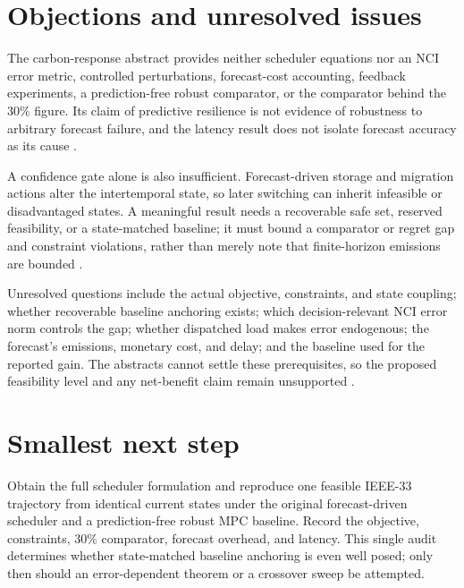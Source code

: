 \documentclass{article}
\begin{document}
\section{Objections and unresolved issues}

The carbon-response abstract provides neither scheduler equations nor an NCI error metric, controlled perturbations, forecast-cost accounting, feedback experiments, a prediction-free robust comparator, or the comparator behind the \(30\%\) figure.  Its claim of predictive resilience is not evidence of robustness to arbitrary forecast failure, and the latency result does not isolate forecast accuracy as its cause .

A confidence gate alone is also insufficient.  Forecast-driven storage and migration actions alter the intertemporal state, so later switching can inherit infeasible or disadvantaged states.  A meaningful result needs a recoverable safe set, reserved feasibility, or a state-matched baseline; it must bound a comparator or regret gap and constraint violations, rather than merely note that finite-horizon emissions are bounded .

Unresolved questions include the actual objective, constraints, and state coupling; whether recoverable baseline anchoring exists; which decision-relevant NCI error norm controls the gap; whether dispatched load makes error endogenous; the forecast's emissions, monetary cost, and delay; and the baseline used for the reported gain.  The abstracts cannot settle these prerequisites, so the proposed feasibility level and any net-benefit claim remain unsupported .

\section{Smallest next step}

Obtain the full scheduler formulation and reproduce one feasible IEEE-33 trajectory from identical current states under the original forecast-driven scheduler and a prediction-free robust MPC baseline.  Record the objective, constraints, \(30\%\) comparator, forecast overhead, and latency.  This single audit determines whether state-matched baseline anchoring is even well posed; only then should an error-dependent theorem or a crossover sweep be attempted.
\end{document}
